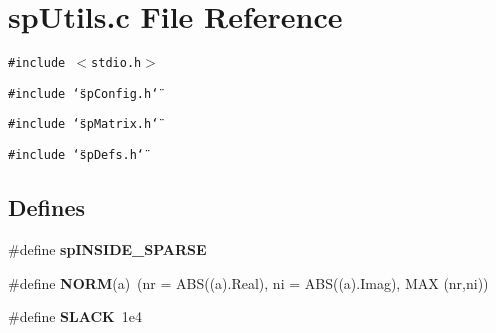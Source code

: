 \section{sp\-Utils.c File Reference}
\label{spUtils_8c}
{\tt \#include $<$stdio.h$>$}\par
{\tt \#include \char`\"{}sp\-Config.h\char`\"{}}\par
{\tt \#include \char`\"{}sp\-Matrix.h\char`\"{}}\par
{\tt \#include \char`\"{}sp\-Defs.h\char`\"{}}\par
\subsection*{Defines}
\begin{CompactItemize}
\item 
{}
\#define {\bf sp\-INSIDE\_\-SPARSE}\label{spUtils_8c_a0}

\item 
{}
\#define {\bf NORM}(a)\ (nr = ABS((a).Real), ni = ABS((a).Imag), MAX (nr,ni))\label{spUtils_8c_a1}

\item 
{}
\#define {\bf SLACK}\ 1e4\label{spUtils_8c_a2}

\end{CompactItemize}
